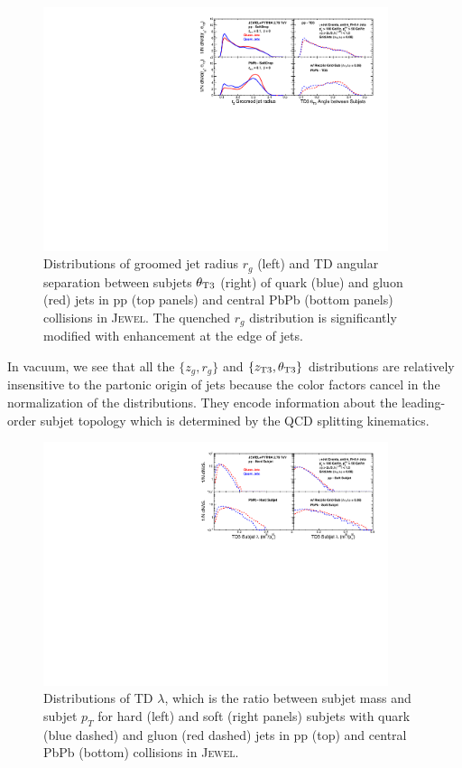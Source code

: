 \documentclass[notoc,preprintnumbers]{JHEP3}
\begin{document}
\begin{figure}[t]
	   \centering
	   \includegraphics[width=0.9\textwidth]{Fig7}
	   \caption{Distributions of groomed jet radius $r_g$ (left) and TD angular separation between subjets $\theta_{\rm T3}$ (right) of quark (blue) and gluon (red) jets in pp (top panels) and central PbPb (bottom panels) collisions in \textsc{Jewel}. The quenched $r_{g}$ distribution is significantly modified with enhancement at the edge of jets.}
\label{fig:comp_rg}
\end{figure}

In vacuum, we see that all the $\{z_g,r_g\}$ and $\{z_{\rm T3},\theta_{\rm T3}\}$ distributions are relatively insensitive to the partonic origin of jets because the color factors cancel in the normalization of the distributions. They encode information about the leading-order subjet topology which is determined by the QCD splitting kinematics.

\begin{figure}[t]
	   \centering
	   \includegraphics[width=0.9\textwidth]{Fig8}
	   \caption{Distributions of TD $\lambda$, which is the ratio between subjet mass and subjet $p_T$ for hard (left) and soft (right panels) subjets with quark (blue dashed) and gluon (red dashed) jets in pp (top) and central PbPb (bottom) collisions in \textsc{Jewel}. }
\label{fig:comp_subjet_m}
\end{figure}
\end{document}
